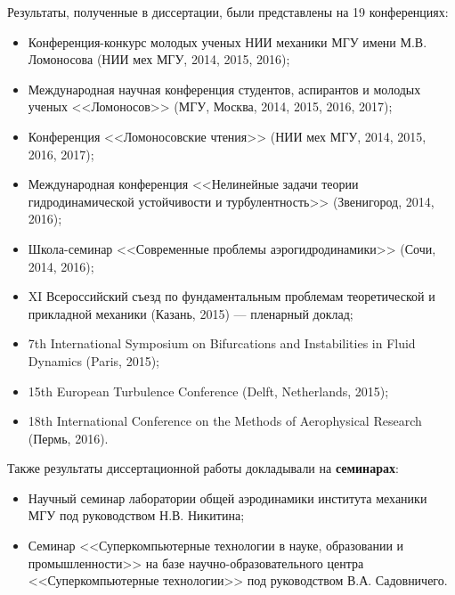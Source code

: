 Результаты, полученные в диссертации, были представлены на 19 конференциях: 
\begin{itemize}
\item Конференция-конкурс молодых ученых НИИ механики МГУ имени М.В. Ломоносова (НИИ мех МГУ, 2014, 2015, 2016); 
\item Международная научная конференция студентов, аспирантов и молодых ученых <<Ломоносов>> (МГУ, Москва, 2014, 2015, 2016, 2017); 
\item Конференция <<Ломоносовские чтения>> (НИИ мех МГУ, 2014, 2015, 2016, 2017); 
\item Международная конференция <<Нелинейные задачи теории гидродинамической устойчивости и турбулентность>> (Звенигород, 2014, 2016); 
\item Школа-семинар <<Современные проблемы аэрогидродинамики>> (Сочи, 2014, 2016);  
\item XI Всероссийский съезд по фундаментальным проблемам теоретической и прикладной механики (Казань, 2015) --- пленарный доклад;
\item 7th International Symposium on Bifurcations and Instabilities in Fluid Dynamics (Paris, 2015);
\item 15th European Turbulence Conference (Delft, Netherlands, 2015); 
\item 18th International Conference on the Methods of Aerophysical Research (Пермь, 2016).
\end{itemize}

Также результаты диссертационной работы докладывали на {\bf семинарах}:
\begin{itemize}
\item Научный семинар лаборатории общей аэродинамики института механики МГУ под руководством  Н.В.  Никитина;
\item Семинар <<Суперкомпьютерные технологии в науке, образовании и промышленности>> на базе научно-образовательного центра <<Суперкомпьютерные технологии>> под руководством В.А. Садовничего. 
\end{itemize}

